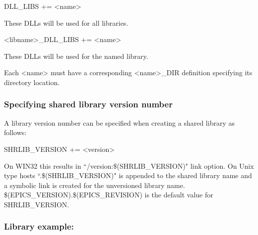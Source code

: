 \begin{description}

\item {}DLL\_LIBS += \textless{}name\textgreater{}

These DLLs will be used for all libraries.

\item \textless{}libname\textgreater{}\_DLL\_LIBS += \textless{}name\textgreater{}

These DLLs will be used for the named library.

Each \textless{}name\textgreater{} must have a corresponding \textless{}name\textgreater{}\_DIR definition specifying its directory location.

\end{description}

\subsubsection{Specifying shared library version number}

A library version number can be specified when creating a shared library as follows:

\begin{description}

\item {}SHRLIB\_VERSION += \textless{}version\textgreater{}

\end{description}

On WIN32 this results in ``/version:\$(SHRLIB\_VERSION)" link option. On Unix type hosts ``.\$(SHRLIB\_VERSION)" is 
appended to the shared library name and a symbolic link is created for the unversioned library name. \\
\$(EPICS\_VERSION).\$(EPICS\_REVISION) is the default value for SHRLIB\_VERSION.

\subsubsection{Library example:}


